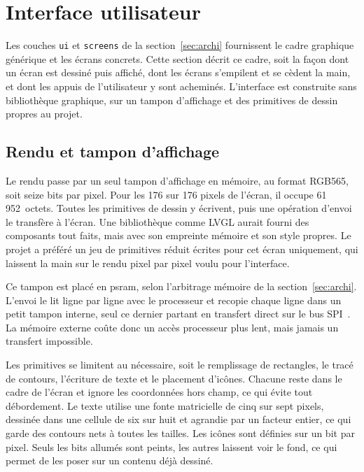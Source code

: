 \section{Interface utilisateur}
\label{sec:soft_ui}

Les couches \texttt{ui} et \texttt{screens} de la section~\ref{sec:archi} fournissent le cadre graphique générique et les écrans concrets. Cette section décrit ce cadre, soit la façon dont un écran est dessiné puis affiché, dont les écrans s'empilent et se cèdent la main, et dont les appuis de l'utilisateur y sont acheminés. L'interface est construite sans bibliothèque graphique, sur un tampon d'affichage et des primitives de dessin propres au projet.

\subsection{Rendu et tampon d'affichage}

Le rendu passe par un seul tampon d'affichage en mémoire, au format RGB565, soit seize bits par pixel. Pour les 176 sur 176 pixels de l'écran, il occupe 61\,952~octets. Toutes les primitives de dessin y écrivent, puis une opération d'envoi le transfère à l'écran. Une bibliothèque comme LVGL aurait fourni des composants tout faits, mais avec son empreinte mémoire et son style propres. Le projet a préféré un jeu de primitives réduit écrites pour cet écran uniquement, qui laissent la main sur le rendu pixel par pixel voulu pour l'interface.

Ce tampon est placé en \gls{psram}, selon l'arbitrage mémoire de la section~\ref{sec:archi}. L'envoi le lit ligne par ligne avec le processeur et recopie chaque ligne dans un petit tampon interne, seul ce dernier partant en transfert direct sur le bus SPI~\cite{ESP32_IDF_guide}. La mémoire externe coûte donc un accès processeur plus lent, mais jamais un transfert impossible.

Les primitives se limitent au nécessaire, soit le remplissage de rectangles, le tracé de contours, l'écriture de texte et le placement d'icônes. Chacune reste dans le cadre de l'écran et ignore les coordonnées hors champ, ce qui évite tout débordement. Le texte utilise une fonte matricielle de cinq sur sept pixels, dessinée dans une cellule de six sur huit et agrandie par un facteur entier, ce qui garde des contours nets à toutes les tailles. Les icônes sont définies sur un bit par pixel. Seuls les bits allumés sont peints, les autres laissent voir le fond, ce qui permet de les poser sur un contenu déjà dessiné.

